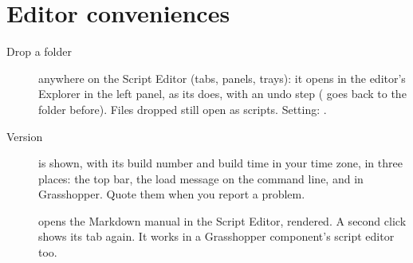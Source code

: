 \section{Editor conveniences}\label{sec:conveniences}

\begin{description}
  \item[Drop a folder] anywhere on the Script Editor (tabs, panels, trays): it opens in the editor's
        Explorer in the left panel, as its  does, with an undo step ( goes back
        to the folder before). Files dropped still open as scripts. Setting:
        .
  \item[Version] is shown, with its build number and build time in your time zone, in three places:
        the top bar, the load message on the command line, and  in Grasshopper. Quote them
        when you report a problem.
  \item[] opens the Markdown manual in the Script Editor, rendered. A second click shows its tab
        again. It works in a Grasshopper component's script editor too.
\end{description}
